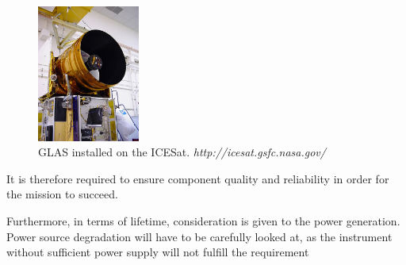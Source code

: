 \begin{figure}
	\begin{center}
  \includegraphics[width=0.3\textwidth]{chapters/img/glas.jpg}
  \end{center}
  \caption{\ac{GLAS} installed on the ICESat. \emph{http://icesat.gsfc.nasa.gov/}}
  \label{fig:glas}
\end{figure}

It is therefore required to ensure component quality and reliability in order for the mission to succeed.

Furthermore, in terms of lifetime, consideration is given to the power generation. Power source degradation will have to be carefully looked at, as the instrument without sufficient power supply will not fulfill the requirement  